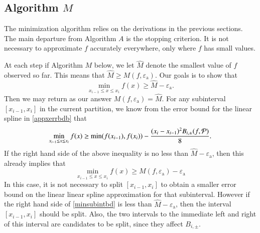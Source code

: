 \documentclass[review]{elsarticle}
\newcommand{\abstol}{\varepsilon_{\textrm{a}}}
\theoremstyle{definition}
\newcommand{\hM}{\widehat{M}}
\newcommand{\minfii}{\min(f(x_{i-1}), f(x_i))} %
\begin{document}
\subsection{Algorithm $M$}  \label{sec:minalgo}
The minimization algorithm relies on the derivations in the previous sections.  The main departure from Algorithm $A$ is the stopping criterion.  It is not necessary to approximate $f$ accurately everywhere, only where $f$ has small values.

At each step if Algorithm $M$ below, we let $\hM$ denote the smallest value of $f$ observed so far.  This means that $\hM \ge M(f,\abstol)$.  Our goals is to show that
\[
\min_{x_{i-1} \le x \le x_i} f(x) \ge \hM - \abstol.
\]
Then we may return as our answer $M(f,\abstol) = \hM$.
For any subinterval $[x_{i-1}, x_i]$ in the current partition, we know from the error bound for the linear spline in \eqref{appxerrbdb} that
\begin{equation} \label{minsubintbd}
\min_{x_{i-1} \le x \le x_i} f(x) \ge \minfii -\frac{(x_i - x_{i-1})^2B_{i,\pm}(f,\cp)}{8}.
\end{equation}
If the right hand side of the above inequality is no less than $\hM - \abstol$, then this already implies that
\[
\min_{x_{i-1} \le x \le x_i} f(x) \ge M(f,\abstol) - \abstol
\]
In this case, it is not necessary to split $[x_{i-1}, x_i]$ to obtain a smaller error bound on the linear linear spline approximation for that subinterval.  However if the right hand side of \eqref{minsubintbd} is less than $\hM - \abstol$, then the interval $[x_{i-1}, x_i]$ should be split.  Also, the two intervals to the immediate left and right of this interval are candidates to be split, since they affect $B_{i,\pm}$.
\end{document}
